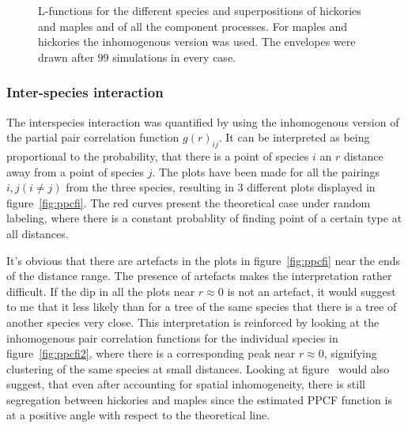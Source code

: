 \documentclass[12pt,a4paper,oneside,article]{memoir}
\begin{document}
\begin{figure}[htb]
\begin{adjustwidth}{-2in}{-2in}
  \end{adjustwidth}
  \caption{L-functions for the different species and superpositions of hickories and maples and of all the component processes. For maples and hickories the inhomogenous version was used. 
  The envelopes were drawn after $99$ simulations in every case.}
  \label{fig:intra_interactions}
\end{figure}


\subsubsection{Inter-species interaction}

The interspecies interaction was quantified by using 
the inhomogenous version of the partial pair correlation function $g(r)_{ij}$. 
It can be interpreted as being proportional to the probability, 
that there is a point of species $i$ an $r$ distance away from a point of species $j$. 
The plots have been made for all the pairings $i,j (i\neq j)$ from the three species, resulting
in $3$ different plots displayed in figure~\ref{fig:ppcfi}. The red curves present the theoretical case under random labeling, 
where there is a constant probablity of finding point of a certain type at all distances.

It's obvious that there are artefacts in the plots in figure~\ref{fig:ppcfi} near the ends
of the distance range. The presence of artefacts makes the interpretation rather difficult.
If the dip in all the plots near $r\approx 0$ is not an artefact, it would suggest to me
that it less likely than for a tree of the same species that there is a tree of another species very close.
This interpretation is reinforced by looking at the inhomogenous pair correlation functions for the individual species
in figure~\ref{fig:ppcfi2}, where there is a corresponding peak near $r\approx 0$, signifying
clustering of the same species at small distances. Looking at figure~\label{fig:ppcfi_hm}
would also suggest, that even after accounting for spatial inhomogeneity, there is still
segregation between hickories and maples since the estimated PPCF function is at a positive angle
with respect to the theoretical line.   
\end{document}
